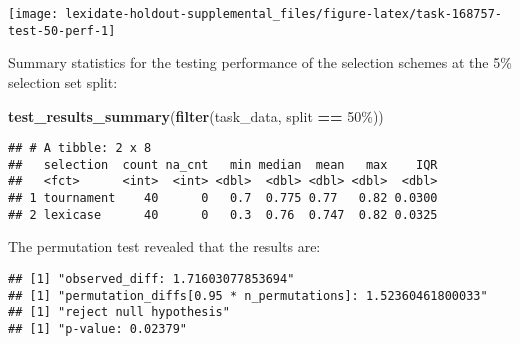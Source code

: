 \documentclass[
]{book}
\newenvironment{Shaded}{\begin{snugshade}}{\end{snugshade}}
\newcommand{\AttributeTok}[1]{\textcolor[rgb]{0.13,0.29,0.53}{#1}}
\newcommand{\DecValTok}[1]{\textcolor[rgb]{0.00,0.00,0.81}{#1}}
\newcommand{\FunctionTok}[1]{\textcolor[rgb]{0.13,0.29,0.53}{\textbf{#1}}}
\newcommand{\NormalTok}[1]{#1}
\newcommand{\OtherTok}[1]{\textcolor[rgb]{0.56,0.35,0.01}{#1}}
\newcommand{\SpecialCharTok}[1]{\textcolor[rgb]{0.81,0.36,0.00}{\textbf{#1}}}
\newcommand{\StringTok}[1]{\textcolor[rgb]{0.31,0.60,0.02}{#1}}
\begin{document}
\texttt{[image: lexidate-holdout-supplemental\_files/figure-latex/task-168757-test-50-perf-1]}

Summary statistics for the testing performance of the selection schemes at the 5\% selection set split:

\begin{Shaded}
\begin{Highlighting}[]
\FunctionTok{test\_results\_summary}\NormalTok{(}\FunctionTok{filter}\NormalTok{(task\_data, split }\SpecialCharTok{==} \StringTok{\textquotesingle{}50\%\textquotesingle{}}\NormalTok{))}
\end{Highlighting}
\end{Shaded}

\begin{verbatim}
## # A tibble: 2 x 8
##   selection  count na_cnt   min median  mean   max    IQR
##   <fct>      <int>  <int> <dbl>  <dbl> <dbl> <dbl>  <dbl>
## 1 tournament    40      0   0.7  0.775 0.77   0.82 0.0300
## 2 lexicase      40      0   0.3  0.76  0.747  0.82 0.0325
\end{verbatim}

The permutation test revealed that the results are:

\begin{Shaded}
\end{Shaded}

\begin{verbatim}
## [1] "observed_diff: 1.71603077853694"
## [1] "permutation_diffs[0.95 * n_permutations]: 1.52360461800033"
## [1] "reject null hypothesis"
## [1] "p-value: 0.02379"
\end{verbatim}
\end{document}
